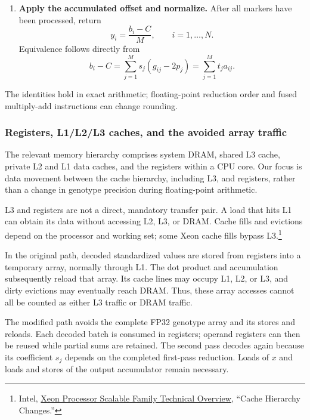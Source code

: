 \documentclass{article}
\begin{document}
\begin{enumerate}
 \item \textbf{Apply the accumulated offset and normalize.}
 After all markers have been processed, return
 \begin{equation}
  \boxed{y_i=\frac{b_i-C}{M}},\qquad i=1,\ldots,N.
 \end{equation}
 Equivalence follows directly from
 \begin{equation}
  b_i-C=\sum_{j=1}^{M}s_j(g_{ij}-2p_j)
       =\sum_{j=1}^{M}t_ja_{ij}.
 \end{equation}
\end{enumerate}
The identities hold in exact arithmetic; floating-point reduction
order and fused multiply-add instructions can change rounding.

\subsubsection{Registers, L1/L2/L3 caches, and the avoided array traffic}

The relevant memory hierarchy comprises system DRAM, shared L3 cache,
private L2 and L1 data caches, and the registers within a CPU core.
Our focus is data movement between the cache hierarchy, including L3,
and registers, rather than a change in genotype precision during
floating-point arithmetic.

L3 and registers are not a direct, mandatory transfer pair.
A load that hits L1 can obtain its data without accessing L2, L3,
or DRAM. Cache fills and evictions depend on the processor and
working set; some Xeon cache fills bypass L3.\footnote{Intel,
\href{https://www.intel.com/content/www/us/en/developer/articles/technical/xeon-processor-scalable-family-technical-overview.html}{Xeon Processor Scalable Family Technical Overview},
``Cache Hierarchy Changes.''}

In the original path, decoded standardized values are stored from
registers into a temporary array, normally through L1.
The dot product and accumulation subsequently reload that array.
Its cache lines may occupy L1, L2, or L3, and dirty evictions may
eventually reach DRAM. Thus, these array accesses cannot all be
counted as either L3 traffic or DRAM traffic.

The modified path avoids the complete FP32 genotype array and its
stores and reloads. Each decoded batch is consumed in registers;
operand registers can then be reused while partial sums are retained.
The second pass decodes again because its coefficient $s_j$ depends
on the completed first-pass reduction. Loads of $x$ and loads and
stores of the output accumulator remain necessary.
\end{document}

